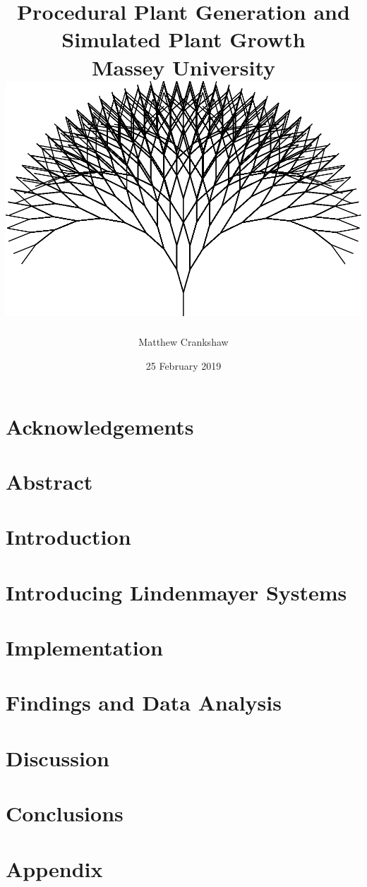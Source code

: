 \documentclass[11pt]{report}
\title{
{ Procedural Plant Generation and Simulated Plant Growth }\\
{\large Massey University}
\\
\vspace{2cm}
{\includegraphics[scale=0.35]{titlepage.png}}
\vspace{2cm}
}
\author{Matthew Crankshaw}
\date{25 February 2019}
\begin{document}
\maketitle

\chapter*{Acknowledgements}

\chapter*{Abstract}

\tableofcontents
\listoffigures


\chapter{Introduction}


\chapter{Introducing Lindenmayer Systems}   


\chapter{Implementation}


\chapter{Findings and Data Analysis}


\chapter{Discussion}


\chapter{Conclusions}


\printglossary[type=\acronymtype]
\printglossary

\appendix
\chapter{Appendix}

\end{document}
